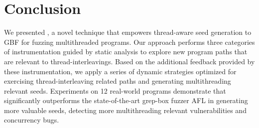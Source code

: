 \section{Conclusion}
We presented \mtfuzz, a novel technique that empowers thread-aware seed generation to GBF
for fuzzing multithreaded programs. Our approach performs three categories of instrumentation guided by static analysis to explore new program paths that are relevant to thread-interleavings. Based on the additional feedback provided by these instrumentation, we apply a series of dynamic strategies optimized for exercising thread-interleaving related paths and generating multithreading relevant seeds. 
Experiments on 12 real-world programs demonstrate that \mtfuzz significantly outperforms the state-of-the-art grep-box fuzzer AFL in generating more valuable seeds, detecting more multithreading relevant vulnerabilities and concurrency bugs.

